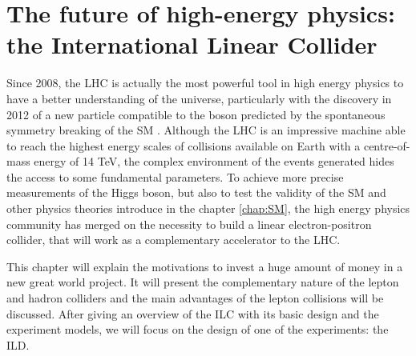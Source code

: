 \chapter[The ILC]{The future of high-energy physics: the International Linear Collider}
\label{chap:ILC}



  Since 2008, the \gls{LHC} is actually the most powerful tool in high energy physics to have a better understanding of the universe, particularly with the discovery in 2012 of a new particle compatible to the boson predicted by the spontaneous symmetry breaking of the SM \cite{Aad2012, Chatrchyan2012}.
  Although the \gls{LHC} is an impressive machine able to reach the highest energy scales of collisions available on Earth with a centre-of-mass energy of 14 TeV, the complex environment of the events generated hides the access to some fundamental parameters. 
  To achieve more precise measurements of the Higgs boson, but also to test the validity of the SM and other physics theories introduce in the chapter \ref{chap:SM}, the high energy physics community has merged on the necessity to build a linear electron-positron collider, that will work as a complementary accelerator to the \gls{LHC}.
  
  This chapter will explain the motivations to invest a huge amount of money in a new great world project. It will present the complementary nature of the lepton and hadron colliders and the main advantages of the lepton collisions will be discussed.
  After giving an overview of the ILC with its basic design and the experiment models, we will focus on the design of one of the experiments: the \gls{ILD}.


